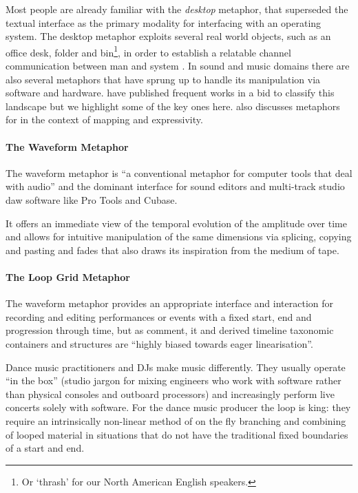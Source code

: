 Most people are already familiar with the \textit{desktop} metaphor, that superseded the textual interface as the primary modality for interfacing with an operating system. The desktop metaphor exploits several real world objects, such as an office desk, folder and bin\footnote{Or `thrash' for our North American English speakers.}, in order to establish a relatable channel communication between man and system \citep{Helander2014}. In sound and music domains there are also several metaphors that have sprung up to handle its manipulation via software and hardware. \cite{Duignan2010, fels2002mapping} have published frequent works in a bid to classify this landscape but we highlight some of the key ones here. \cite{fels2002mapping} also discusses metaphors for in the context of mapping and expressivity.

\paragraph{The Waveform Metaphor}

The waveform metaphor is ``a conventional metaphor for computer tools that deal with audio'' \citep{Duignan2004} and the dominant interface for sound editors and multi-track studio \acrshort{daw} software like Pro Tools and Cubase.

It offers an immediate view of the temporal evolution of the amplitude over time and allows for intuitive manipulation of the same dimensions via splicing, copying and pasting and fades that also draws its inspiration from the medium of tape. 

\paragraph{The Loop Grid Metaphor}

The waveform metaphor provides an appropriate interface and interaction for recording and editing performances or events with a fixed start, end and progression through time, but as  \cite{Duignan2005} comment, it and derived timeline taxonomic containers and structures are ``highly biased towards eager linearisation''.

Dance music practitioners and DJs make music differently. They usually operate ``in the box'' (studio jargon for mixing engineers who work with software rather than physical consoles and outboard processors) and increasingly perform live concerts solely with software. For the dance music producer the loop is king: they require an intrinsically non-linear method of on the fly branching and combining of looped material in situations that do not have the traditional fixed boundaries of a start and end. 

